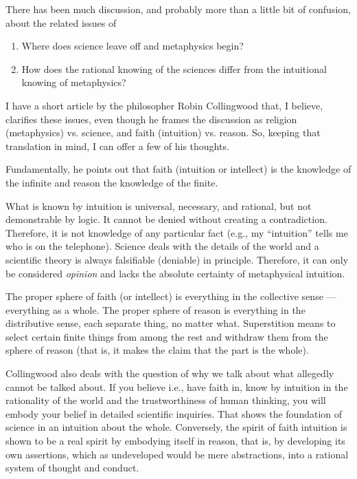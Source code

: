 There has been much discussion, and probably more than a little bit of confusion, about the related issues of

\begin{enumerate}


\item Where does science leave off and metaphysics begin?

\item How does the rational knowing of the sciences differ from the intuitional knowing of metaphysics?
\end{enumerate}


I have a short article by the philosopher Robin Collingwood that, I believe, clarifies these issues, even though he frames the discussion as religion (metaphysics) vs. science, and faith (intuition) vs. reason. So, keeping that translation in mind, I can offer a few of his thoughts.

Fundamentally, he points out that faith (intuition or intellect) is the knowledge of the infinite and reason the knowledge of the finite.

What is known by intuition is universal, necessary, and rational, but not demonstrable by logic. It cannot be denied without creating a contradiction. Therefore, it is not knowledge of any particular fact (e.g., my ``intuition'' tells me who is on the telephone). Science deals with the details of the world and a scientific theory is always falsifiable (deniable) in principle. Therefore, it can only be considered \emph{opinion} and lacks the absolute certainty of metaphysical intuition.

The proper sphere of faith (or intellect) is everything in the collective sense --- everything as a whole. The proper sphere of reason is everything in the distributive sense, each separate thing, no matter what. Superstition means to select certain finite things from among the rest and withdraw them from the sphere of reason (that is, it makes the claim that the part is the whole).

Collingwood also deals with the question of why we talk about what allegedly cannot be talked about. If you believe i.e., have faith in, know by intuition in the rationality of the world and the trustworthiness of human thinking, you will embody your belief in detailed scientific inquiries. That shows the foundation of science in an intuition about the whole. Conversely, the spirit of faith intuition is shown to be a real spirit by embodying itself in reason, that is, by developing its own assertions, which as undeveloped would be mere abstractions, into a rational system of thought and conduct.



